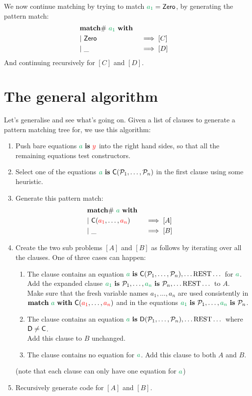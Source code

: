 \documentclass[a4paper, 11pt]{article}
\theoremstyle{definition}
\begin{document}
We now continue matching by trying to match $\bvar{a_1} = \Zero$, by generating the pattern match:
\begin{alignat*}{4}
  \matchwithZ{\bvar{a_1}} \\
  \clause{\Zero}{[C]} \\
  \clause{\_}{[D]}
\end{alignat*}
And continuing recursively for $[C]$ and $[D]$.

\section{The general algorithm}

Let's generalise and see what's going on. Given a list of clauses to generate a pattern matching tree for, we use this algorithm:

\begin{enumerate}
  \item Push bare equations $\ba \is \fvar y$ into the right hand sides, so that all the remaining equations test constructors.
  \item Select one of the equations $\ba \is \C(\pat_1, \dots, \pat_n)$ in the first clause using some heuristic.
  \item Generate this pattern match:
  \begin{alignat*}{4}
    \matchwithZ{\ba} \\
    \clause{\C(\fvar{a_1}, \dots, \fvar{a_n})}{[A]} \\
    \clause{\_}{[B]}
  \end{alignat*}
  \item Create the two sub problems $[A]$ and $[B]$ as follows by iterating over all the clauses. One of three cases can happen:
  \begin{enumerate}
    \item The clause contains an equation $\ba \is \C(\pat_1, \dots, \pat_n), \dots \text{REST} \dots$ for $\ba$. \\
          Add the expanded clause $\bvar{a_1} \is \pat_1, \dots, \bvar{a_n} \is \pat_n, \dots \text{REST} \dots$ to $A$. \\
          Make sure that the fresh variable names $a_1,\dots,a_n$ are used consistently in \\
          $\mathbf{match}\ \ba\ \mathbf{with}\ \C(\fvar{a_1}, \dots, \fvar{a_n})$ and in the equations $\bvar{a_1} \is \pat_1, \dots, \bvar{a_n} \is \pat_n$.
    \item The clause contains an equation $\ba \is \mathsf{D}(\pat_1, \dots, \pat_n), \dots \text{REST} \dots$ where $\mathsf{D} \neq \mathsf{\textcolor{black}{C}}$. \\
          Add this clause to $B$ unchanged.
    \item The clause contains no equation for $\ba$. Add this clause to both $A$ and $B$.
  \end{enumerate}
  (note that each clause can only have one equation for $\ba$)
  \item Recursively generate code for $[A]$ and $[B]$.
\end{enumerate}
\end{document}
